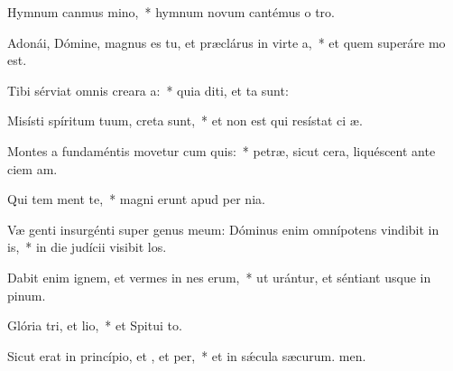 \item Hymnum canmus mino,~* hymnum novum cantémus o tro.
\item Adonái, Dómine, magnus es tu, et præclárus in virte a,~* et quem superáre mo est.
\item Tibi sérviat omnis creara a:~* quia diti, et ta sunt:
\item Misísti spíritum tuum,  creta sunt,~* et non est qui resístat ci æ.
\item Montes a fundaméntis movetur cum quis:~* petræ, sicut cera, liquéscent ante ciem am.
\item Qui tem ment te,~* magni erunt apud  per nia.
\item Væ genti insurgénti super genus meum: Dóminus enim omnípotens vindibit in is,~* in die judícii visibit los.
\item Dabit enim ignem, et vermes in nes erum,~* ut urántur, et séntiant usque in pinum.
\item Glória tri, et lio,~* et Spitui to.
\item Sicut erat in princípio, et , et per,~* et in sǽcula sæcurum. men.
